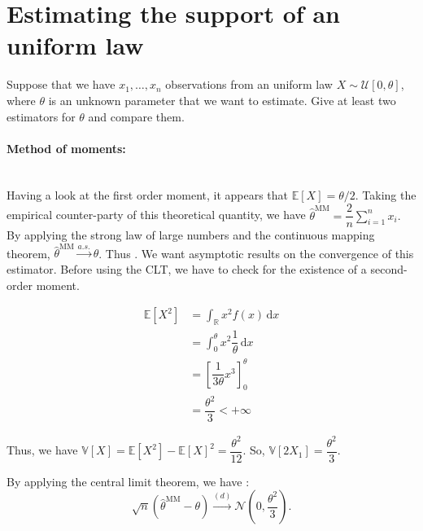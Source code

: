 \section{Estimating the support of an uniform law}

\begin{tcolorbox}[width=\linewidth, sharp corners=all, colback=white!95!black]
Suppose that we have $x_1,\dots,x_n$ observations from an uniform law $X \sim \mathcal{U}[0,\theta]$, where $\theta$ is an unknown parameter that we want to estimate. Give at least two estimators for $\theta$ and compare them.
\end{tcolorbox}

\paragraph*{Method of moments:}\\

Having a look at the first order moment, it appears that $\mathbb{E}[X] = \theta/2$. Taking the empirical counter-party of this theoretical quantity, we have $\boxed{\hat{\theta}^{\text{MM}} = \dfrac{2}{n}\sum\limits_{i=1}^n x_i.}$\newline
By applying the strong law of large numbers and the continuous mapping theorem, $\hat{\theta}^{\text{MM}} \xrightarrow{a.s.} \theta$. Thus .\newline
We want asymptotic results on the convergence of this estimator. Before using the CLT, we have to check for the existence of a second-order moment.

\begin{align*}
    \mathbb{E}[X^2] &= \displaystyle \int_{\mathbb{R}} x^2 f(x) \, \mathrm{d}x \\
    &= \displaystyle \int_{0}^{\theta} x^2 \dfrac{1}{\theta} \, \mathrm{d}x \\
    &= \left[ \dfrac{1}{3\theta}x^3 \right]^\theta_0 \\
    &= \dfrac{\theta^2}{3} < +\infty
\end{align*}

Thus, we have $\mathbb{V}[X] = \mathbb{E}[X^2] - \mathbb{E}[X]^2 = \dfrac{\theta^2}{12}$. So, $\mathbb{V}[2X_1]  = \dfrac{\theta^2}{3}$.\newline

By applying the central limit theorem, we have : $$\sqrt{n}(\hat{\theta}^{\text{MM}} - \theta) \xrightarrow{(d)} \mathcal{N}\left(0, \dfrac{\theta^2}{3}\right).$$

